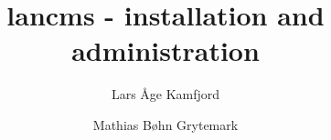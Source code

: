 \titlepage
\title{lancms - installation and administration}
\author{Lars Åge Kamfjord \and Mathias Bøhn Grytemark}
\maketitle


